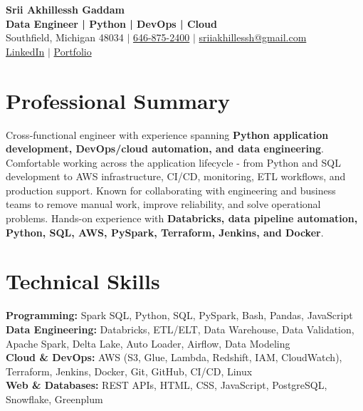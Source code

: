 \documentclass[letterpaper,10pt]{article}
\begin{document}
\fontsize{9.35pt}{10.45pt}\selectfont

\begin{center}
    {\LARGE \textbf{Srii Akhillessh Gaddam}} \\[-1pt]
    \textbf{Data Engineer | Python | DevOps | Cloud} \\[2pt]
    Southfield, Michigan 48034 $|$
    \href{tel:6468752400}{646-875-2400} $|$
    \href{mailto:sriiakhillessh@gmail.com}{sriiakhillessh@gmail.com} \\[1pt]
    \href{https://www.linkedin.com/in/srii-akhiilessh-gaddam-b48668191/}{LinkedIn} $|$
    \href{https://sriiakhillesshg.github.io/portfolio/}{Portfolio}
\end{center}
\vspace{-8pt}

\section{Professional Summary}
\small{Cross-functional engineer with experience spanning \textbf{Python application development, DevOps/cloud automation, and data engineering}. Comfortable working across the application lifecycle - from Python and SQL development to AWS infrastructure, CI/CD, monitoring, ETL workflows, and production support. Known for collaborating with engineering and business teams to remove manual work, improve reliability, and solve operational problems. Hands-on experience with \textbf{Databricks, data pipeline automation, Python, SQL, AWS, PySpark, Terraform, Jenkins, and Docker}.}

\section{Technical Skills}
\small{
\textbf{Programming:} Spark SQL, Python, SQL, PySpark, Bash, Pandas, JavaScript \\
\textbf{Data Engineering:} Databricks, ETL/ELT, Data Warehouse, Data Validation, Apache Spark, Delta Lake, Auto Loader, Airflow, Data Modeling \\
\textbf{Cloud \& DevOps:} AWS (S3, Glue, Lambda, Redshift, IAM, CloudWatch), Terraform, Jenkins, Docker, Git, GitHub, CI/CD, Linux \\
\textbf{Web \& Databases:} REST APIs, HTML, CSS, JavaScript, PostgreSQL, Snowflake, Greenplum
}
\end{document}
